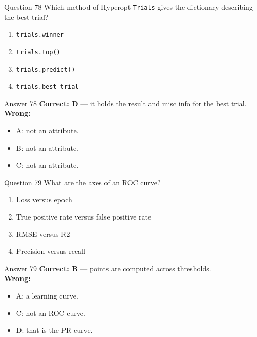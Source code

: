\documentclass[aspectratio=169,11pt]{beamer}
\begin{document}
\begin{frame}{Question 78}
Which method of Hyperopt \texttt{Trials} gives the dictionary describing the best trial?
\begin{enumerate}[label=\Alph*.]
\item \texttt{trials.winner}
\item \texttt{trials.top()}
\item \texttt{trials.predict()}
\item \texttt{trials.best\_trial}
\end{enumerate}
\end{frame}
\begin{frame}{Answer 78}
\textbf{Correct: D} --- it holds the result and misc info for the best trial.\\
\vspace{0.5em}
\textbf{Wrong:}
\begin{itemize}
\item A: not an attribute.
\item B: not an attribute.
\item C: not an attribute.
\end{itemize}
\end{frame}

\begin{frame}{Question 79}
What are the axes of an ROC curve?
\begin{enumerate}[label=\Alph*.]
\item Loss versus epoch
\item True positive rate versus false positive rate
\item RMSE versus R2
\item Precision versus recall
\end{enumerate}
\end{frame}
\begin{frame}{Answer 79}
\textbf{Correct: B} --- points are computed across thresholds.\\
\vspace{0.5em}
\textbf{Wrong:}
\begin{itemize}
\item A: a learning curve.
\item C: not an ROC curve.
\item D: that is the PR curve.
\end{itemize}
\end{frame}
\end{document}
